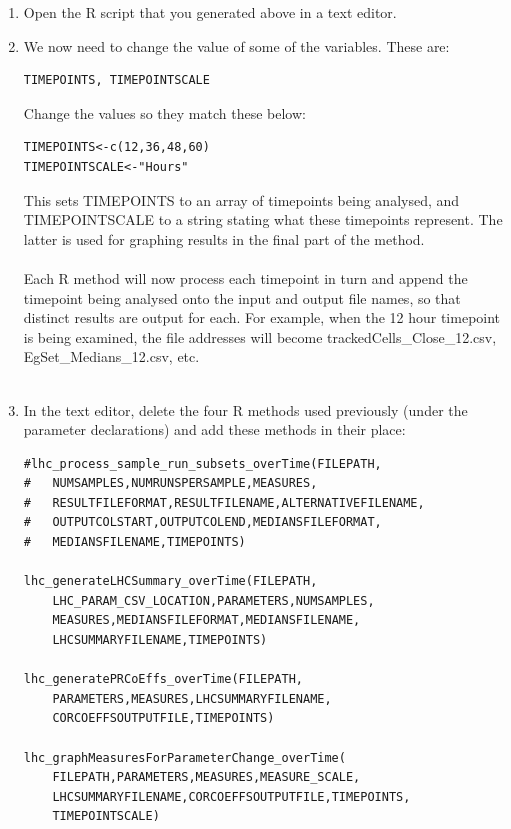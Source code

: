\documentclass[a4paper,11pt]{article}
\begin{document}
\begin{enumerate}
\item Open the R script that you generated above in a text editor.
\item We now need to change the value of some of the variables.  These are:
\begin{verbatim}
TIMEPOINTS, TIMEPOINTSCALE
\end{verbatim}
Change the values so they match these below:
\begin{verbatim}
TIMEPOINTS<-c(12,36,48,60)
TIMEPOINTSCALE<-"Hours"
\end{verbatim}

This sets TIMEPOINTS to an array of timepoints being analysed, and TIMEPOINTSCALE to a string stating what these timepoints represent. The latter is used for graphing results in the final part of the method.\\
\\
Each R method will now process each timepoint in turn and append the timepoint being analysed onto the input and output file names, so that distinct results are output for each.  For example, when the 12 hour timepoint is being examined, the file addresses will become trackedCells\_Close\_12.csv, EgSet\_Medians\_12.csv, etc.\\
\\

\item In the text editor, delete the four R methods used previously (under the parameter declarations) and add these methods in their place:
\begin{verbatim}
#lhc_process_sample_run_subsets_overTime(FILEPATH,
#	NUMSAMPLES,NUMRUNSPERSAMPLE,MEASURES,
#	RESULTFILEFORMAT,RESULTFILENAME,ALTERNATIVEFILENAME,
#	OUTPUTCOLSTART,OUTPUTCOLEND,MEDIANSFILEFORMAT,
#	MEDIANSFILENAME,TIMEPOINTS)

lhc_generateLHCSummary_overTime(FILEPATH,
	LHC_PARAM_CSV_LOCATION,PARAMETERS,NUMSAMPLES,
	MEASURES,MEDIANSFILEFORMAT,MEDIANSFILENAME,
	LHCSUMMARYFILENAME,TIMEPOINTS)

lhc_generatePRCoEffs_overTime(FILEPATH,
	PARAMETERS,MEASURES,LHCSUMMARYFILENAME,
	CORCOEFFSOUTPUTFILE,TIMEPOINTS)
	
lhc_graphMeasuresForParameterChange_overTime(
	FILEPATH,PARAMETERS,MEASURES,MEASURE_SCALE,
	LHCSUMMARYFILENAME,CORCOEFFSOUTPUTFILE,TIMEPOINTS,
	TIMEPOINTSCALE)
	
\end{verbatim}


\end{enumerate}
\end{document}
